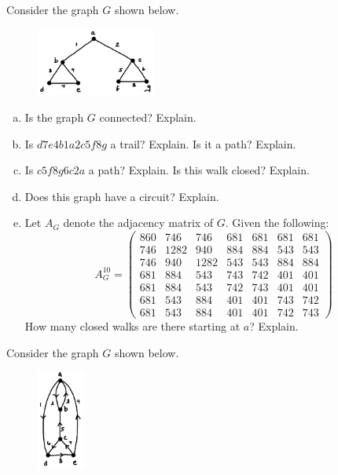 \documentclass[11pt,letterpaper]{article}
\begin{document}

 Consider the graph $G$ shown below.
	\begin{figure}[h]
	\centering
	\includegraphics[width=0.35\textwidth]{graph1.jpg}
	\end{figure}

\begin{enumerate}[(a)]
\item Is the graph $G$ connected? Explain.
\item Is $d7e4b1a2c5f8g$ a trail? Explain. Is it a path? Explain.
\item Is $c5f8g6c2a$ a path? Explain. Is this walk closed? Explain.
\item Does this graph have a circuit? Explain. 
\item Let $A_G$ denote the adjacency matrix of $G$. Given the following:
	\[
	A_G^{10}=
	\begin{pmatrix}
	860 & 746 & 746 & 681 & 681 & 681 & 681 \\
	746 & 1282 & 940 & 884 & 884 & 543 & 543 \\
	746 & 940 & 1282 & 543 & 543 & 884 & 884 \\
	681 & 884 & 543 & 743 & 742 & 401 & 401 \\
	681 & 884 & 543 & 742 & 743 & 401 & 401 \\
	681 & 543 & 884 & 401 & 401 & 743 & 742 \\
	681 & 543 & 884 & 401 & 401 & 742 & 743
	\end{pmatrix}
	\]
How many closed walks are there starting at $a$? Explain. 
\end{enumerate}



\newpage



 Consider the graph $G$ shown below.
	\begin{figure}[h]
	\centering
	\includegraphics[width=0.14\textwidth]{graph2.jpg}
	\end{figure}
\end{document}
